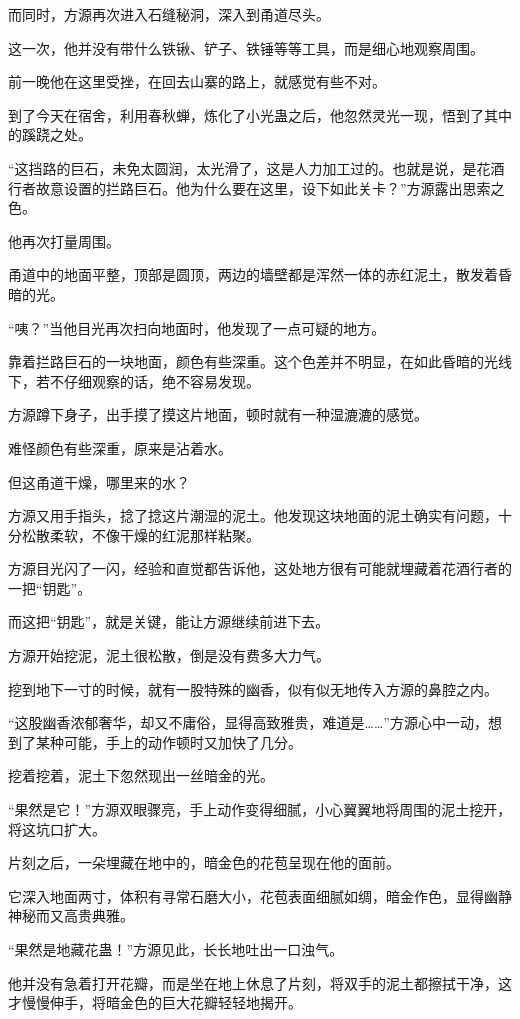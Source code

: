 \begin{this_body}
而同时，方源再次进入石缝秘洞，深入到甬道尽头。

这一次，他并没有带什么铁锹、铲子、铁锤等等工具，而是细心地观察周围。

前一晚他在这里受挫，在回去山寨的路上，就感觉有些不对。

到了今天在宿舍，利用春秋蝉，炼化了小光蛊之后，他忽然灵光一现，悟到了其中的蹊跷之处。

“这挡路的巨石，未免太圆润，太光滑了，这是人力加工过的。也就是说，是花酒行者故意设置的拦路巨石。他为什么要在这里，设下如此关卡？”方源露出思索之色。

他再次打量周围。

甬道中的地面平整，顶部是圆顶，两边的墙壁都是浑然一体的赤红泥土，散发着昏暗的光。

“咦？”当他目光再次扫向地面时，他发现了一点可疑的地方。

靠着拦路巨石的一块地面，颜色有些深重。这个色差并不明显，在如此昏暗的光线下，若不仔细观察的话，绝不容易发现。

方源蹲下身子，出手摸了摸这片地面，顿时就有一种湿漉漉的感觉。

难怪颜色有些深重，原来是沾着水。

但这甬道干燥，哪里来的水？

方源又用手指头，捻了捻这片潮湿的泥土。他发现这块地面的泥土确实有问题，十分松散柔软，不像干燥的红泥那样粘聚。

方源目光闪了一闪，经验和直觉都告诉他，这处地方很有可能就埋藏着花酒行者的一把“钥匙”。

而这把“钥匙”，就是关键，能让方源继续前进下去。

方源开始挖泥，泥土很松散，倒是没有费多大力气。

挖到地下一寸的时候，就有一股特殊的幽香，似有似无地传入方源的鼻腔之内。

“这股幽香浓郁奢华，却又不庸俗，显得高致雅贵，难道是……”方源心中一动，想到了某种可能，手上的动作顿时又加快了几分。

挖着挖着，泥土下忽然现出一丝暗金的光。

“果然是它！”方源双眼骤亮，手上动作变得细腻，小心翼翼地将周围的泥土挖开，将这坑口扩大。

片刻之后，一朵埋藏在地中的，暗金色的花苞呈现在他的面前。

它深入地面两寸，体积有寻常石磨大小，花苞表面细腻如绸，暗金作色，显得幽静神秘而又高贵典雅。

“果然是地藏花蛊！”方源见此，长长地吐出一口浊气。

他并没有急着打开花瓣，而是坐在地上休息了片刻，将双手的泥土都擦拭干净，这才慢慢伸手，将暗金色的巨大花瓣轻轻地揭开。


\end{this_body}
